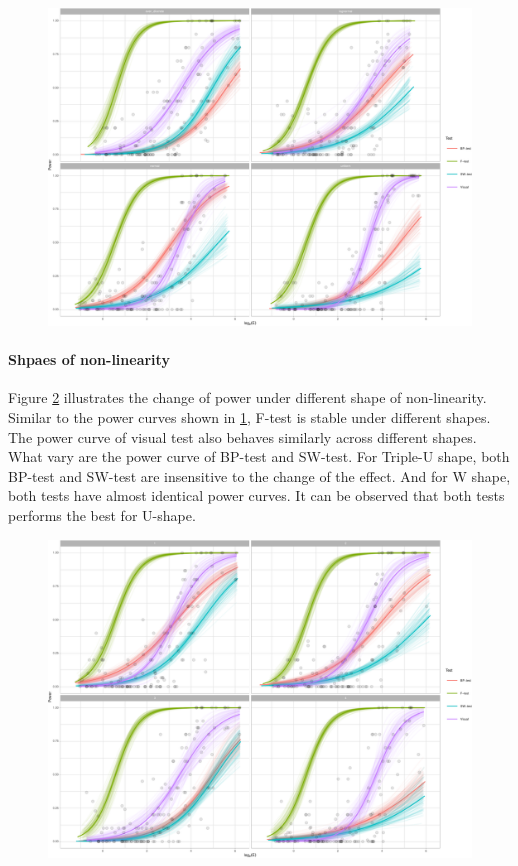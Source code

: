 \documentclass[]{interact}
\theoremstyle{plain}%
\theoremstyle{definition}
\theoremstyle{remark}
\begin{document}
\begin{figure}
\includegraphics[width=1\linewidth]{paper_comparison_files/figure-latex/dist-power-1} \caption{\label{dist-power}}\label{fig:dist-power}
\end{figure}

\hypertarget{shpaes-of-non-linearity}{%
\paragraph{Shpaes of non-linearity}\label{shpaes-of-non-linearity}}

Figure \ref{fig:shape-power} illustrates the change of power under
different shape of non-linearity. Similar to the power curves shown in
\ref{fig:dist-power}, F-test is stable under different shapes. The power
curve of visual test also behaves similarly across different shapes.
What vary are the power curve of BP-test and SW-test. For Triple-U
shape, both BP-test and SW-test are insensitive to the change of the
effect. And for W shape, both tests have almost identical power curves.
It can be observed that both tests performs the best for U-shape.

\begin{figure}
\includegraphics[width=1\linewidth]{paper_comparison_files/figure-latex/shape-power-1} \caption{\label{shape-power}}\label{fig:shape-power}
\end{figure}
\end{document}
